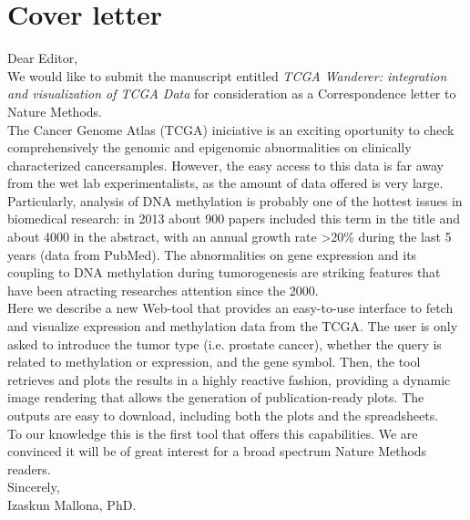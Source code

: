 \documentclass{article}
\begin{document}





\section*{Cover letter}


Dear Editor,\\

We would like to submit the manuscript entitled \textit{TCGA Wanderer: integration and visualization of TCGA Data} for consideration as a Correspondence letter to Nature Methods.\\

The Cancer Genome Atlas (TCGA) iniciative is an exciting oportunity to check comprehensively the genomic and epigenomic abnormalities on clinically characterized cancersamples. However, the easy access to this data is far away from the wet lab experimentalists, as the amount of data offered is very large.\\

Particularly, analysis of DNA methylation is probably one of the hottest issues in biomedical research: in 2013 about 900 papers included this term in the title and about 4000 in the abstract, with an annual growth rate >20\% during the last 5 years (data from PubMed). The abnormalities on gene expression and its coupling to DNA methylation during tumorogenesis are striking features that have been atracting researches attention since the 2000.\\

Here we describe a new Web-tool that provides an easy-to-use interface to fetch and visualize expression and methylation data from the TCGA. The user is only asked to introduce the tumor type (i.e. prostate cancer), whether the query is related to methylation or expression, and the gene symbol. Then, the tool retrieves and plots the results in a highly reactive fashion, providing a dynamic image rendering that allows the generation of publication-ready plots. The outputs are easy to download, including both the plots and the spreadsheets.\\

To our knowledge this is the first tool that offers this capabilities. We are convinced it will be of great interest for a broad spectrum Nature Methods readers.\\


Sincerely, \\
Izaskun Mallona, PhD.
\end{document}
